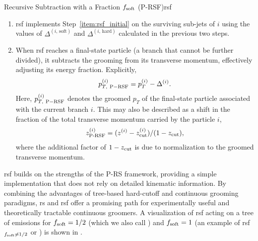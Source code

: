 \begin{definitionbox}{Recursive Subtraction with a Fraction \(f_{\rm soft}\) (P-RSF)}{rsf}
\begin{enumerate}
        \item
        \gls{rsf} implements Step~\ref{item:rsf_initial} on the surviving sub-jets of \(i\) using the values of \(\Delta^{(i,\,\text{soft})}\) and \(\Delta^{(i,\,\text{hard})}\) calculated in the previous two steps.

        \item
        When \gls{rsf} reaches a final-state particle (a branch that cannot be further divided), it subtracts the grooming from its transverse momentum, effectively adjusting its energy fraction.
        Explicitly,
        \begin{align}
            p^{(i)}_{T,~{\rm P-RSF}} = p^{(i)}_T - \Delta^{(i)}.
        \end{align}
        Here, \(p^{(i)}_{T,~{\rm P-RSF}}\) denotes the groomed \(p_T\) of the final-state particle associated with the current branch \(i\).
        This may also be described as a shift in the fraction of the total transverse momentum carried by the particle \(i\),
        \begin{align}
            z^{(i)}_{\text{P-RSF}} = (z^{(i)} - z_{\rm cut}^{(i)})/(1-z_{\rm cut})
            ,
        \end{align}
        where the additional factor of \(1 - z_{\rm cut}\) is due to normalization to the groomed transverse momentum.
        \label{item:rsf_final}
    \end{enumerate}
\end{definitionbox}

\gls{rsf} builds on the strengths of the P-RS framework, providing a simple implementation that does not rely on detailed kinematic information.
%
By combining the advantages of tree-based hard-cutoff and continuous \PIRANHA{} grooming paradigms, \gls{rs} and \gls{rsf} offer a promising path for experimentally useful and theoretically tractable continuous groomers.
%
A visualization of \gls{rsf} acting on a tree of emissions for \(f_{\rm soft} = 1/2\) (which we also call ) and \(f_{\rm soft} = 1\) (an example of \gls{rsf}\(_{f_{\rm soft}\neq1/2}\) or ) is shown in .


